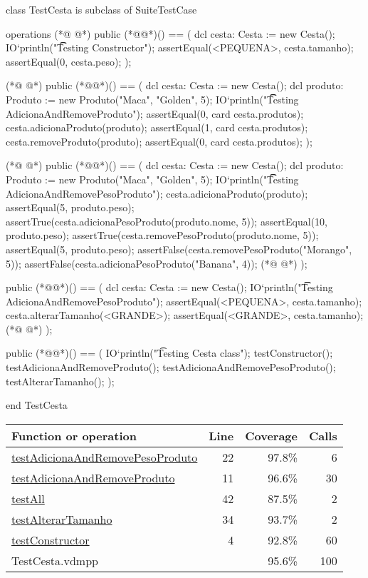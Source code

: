 \begin{vdmpp}[breaklines=true]
class TestCesta is subclass of SuiteTestCase

operations
(*@
\label{testConstructor:4}
@*)
  public (*@@*)() == (
   dcl cesta: Cesta := new Cesta();
    IO`println("\t\t Testing Constructor");
    assertEqual(<PEQUENA>, cesta.tamanho);
    assertEqual(0, cesta.peso);
  );
  
(*@
\label{testAdicionaAndRemoveProduto:11}
@*)
  public (*@@*)() == (
   dcl cesta: Cesta := new Cesta();
   dcl produto: Produto := new Produto("Maca", "Golden", 5);
   IO`println("\t\t Testing AdicionaAndRemoveProduto");
   assertEqual(0, card cesta.produtos); 
   cesta.adicionaProduto(produto);
   assertEqual(1, card cesta.produtos);  
   cesta.removeProduto(produto);
   assertEqual(0, card cesta.produtos);  
  );
  
(*@
\label{testAdicionaAndRemovePesoProduto:22}
@*)
  public (*@@*)() == (
   dcl cesta: Cesta := new Cesta();
   dcl produto: Produto := new Produto("Maca", "Golden", 5);
  IO`println("\t\t Testing AdicionaAndRemovePesoProduto");
  cesta.adicionaProduto(produto);
  assertEqual(5, produto.peso);  
  assertTrue(cesta.adicionaPesoProduto(produto.nome, 5));
  assertEqual(10, produto.peso);  
  assertTrue(cesta.removePesoProduto(produto.nome, 5));
  assertEqual(5, produto.peso);  
  assertFalse(cesta.removePesoProduto("Morango", 5));
  assertFalse(cesta.adicionaPesoProduto("Banana", 4)); 
(*@
\label{testAlterarTamanho:34}
@*)
  );
  
  public (*@@*)() == (
   dcl cesta: Cesta := new Cesta();
  IO`println("\t\t Testing AdicionaAndRemovePesoProduto");
  assertEqual(<PEQUENA>, cesta.tamanho);
  cesta.alterarTamanho(<GRANDE>);
  assertEqual(<GRANDE>, cesta.tamanho);
(*@
\label{testAll:42}
@*)
  );

  public (*@@*)() == (
    IO`println("\t Testing Cesta class");
    testConstructor();
    testAdicionaAndRemoveProduto();
    testAdicionaAndRemovePesoProduto();
    testAlterarTamanho();
  );

end TestCesta
\end{vdmpp}
\bigskip
\begin{longtable}{|l|r|r|r|}
\hline
Function or operation & Line & Coverage & Calls \\
\hline
\hline
\hyperref[testAdicionaAndRemovePesoProduto:22]{testAdicionaAndRemovePesoProduto} & 22&97.8\% & 6 \\
\hline
\hyperref[testAdicionaAndRemoveProduto:11]{testAdicionaAndRemoveProduto} & 11&96.6\% & 30 \\
\hline
\hyperref[testAll:42]{testAll} & 42&87.5\% & 2 \\
\hline
\hyperref[testAlterarTamanho:34]{testAlterarTamanho} & 34&93.7\% & 2 \\
\hline
\hyperref[testConstructor:4]{testConstructor} & 4&92.8\% & 60 \\
\hline
\hline
TestCesta.vdmpp & & 95.6\% & 100 \\
\hline
\end{longtable}

